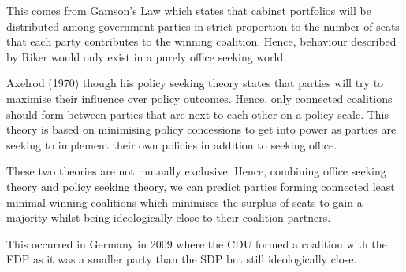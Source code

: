 \documentclass[12pt, letterpaper]{article}
\begin{document}
This comes from Gamson's Law which states that cabinet portfolios will be distributed among government parties in strict proportion to the number of seats that each party contributes to the winning coalition. Hence, behaviour described by Riker would only exist in a purely office seeking world.

Axelrod (1970) though his policy seeking theory states that parties will try to maximise their influence over policy outcomes. Hence, only connected coalitions should form between parties that are next to each other on a policy scale. This theory is based on minimising policy concessions to get into power as parties are seeking to implement their own policies in addition to seeking office.

These two theories are not mutually exclusive. Hence, combining office seeking theory and policy seeking theory, we can predict parties forming connected least minimal winning coalitions which minimises the surplus of seats to gain a majority whilst being ideologically close to their coalition partners.

This occurred in Germany in 2009 where the CDU formed a coalition with the FDP as it was a smaller party than the SDP but still ideologically close.

\newpage
\end{document}

